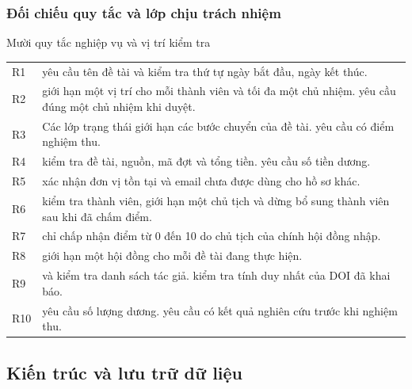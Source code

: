 \subsubsection{Đối chiếu quy tắc và lớp chịu trách nhiệm}
\begin{ReportTableHere}
\caption{Mười quy tắc nghiệp vụ và vị trí kiểm tra}\label{tab:rules}
\small\singlespacing
\begin{tabularx}{\linewidth}{@{}lL@{}}\toprule
R1 &  yêu cầu tên đề tài và kiểm tra thứ tự ngày bắt đầu, ngày kết thúc.\\
R2 &  giới hạn một vị trí cho mỗi thành viên và tối đa một chủ nhiệm.  yêu cầu đúng một chủ nhiệm khi duyệt.\\
R3 & Các lớp trạng thái giới hạn các bước chuyển của đề tài.  yêu cầu có điểm nghiệm thu.\\
R4 &  kiểm tra đề tài, nguồn, mã đợt và tổng tiền.  yêu cầu số tiền dương.\\
R5 &  xác nhận đơn vị tồn tại và email chưa được dùng cho hồ sơ khác.\\
R6 &  kiểm tra thành viên, giới hạn một chủ tịch và dừng bổ sung thành viên sau khi đã chấm điểm.\\
R7 &  chỉ chấp nhận điểm từ 0 đến 10 do chủ tịch của chính hội đồng nhập.\\
R8 &  giới hạn một hội đồng cho mỗi đề tài đang thực hiện.\\
R9 &  và  kiểm tra danh sách tác giả.  kiểm tra tính duy nhất của DOI đã khai báo.\\
R10 &  yêu cầu số lượng dương.  yêu cầu có kết quả nghiên cứu trước khi nghiệm thu.\\
\bottomrule\end{tabularx}
\end{ReportTableHere}

\label{sec:design}
\subsection{Kiến trúc và lưu trữ dữ liệu}\label{sec:architecture}

